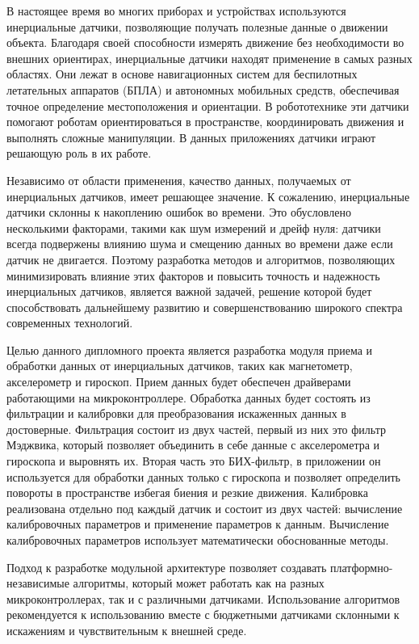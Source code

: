 \label{sec:intro}

В настоящее время во многих приборах и устройствах используются инерциальные датчики, 
позволяющие получать полезные данные о движении объекта.
Благодаря своей способности измерять движение без необходимости во внешних ориентирах, 
инерциальные датчики находят применение в самых разных областях. Они лежат в основе навигационных 
систем для беспилотных летательных аппаратов (БПЛА) и автономных мобильных средств, обеспечивая 
точное определение местоположения и ориентации. В робототехнике эти датчики помогают роботам 
ориентироваться в пространстве, координировать движения и выполнять сложные манипуляции.
В данных приложениях датчики играют решающую роль в их работе.

Независимо от области применения, качество данных, получаемых от инерциальных датчиков, имеет решающее значение.
К сожалению, инерциальные датчики склонны к накоплению ошибок во времени. Это обусловлено несколькими факторами, 
такими как шум измерений и дрейф нуля: датчики всегда подвержены влиянию шума и смещению данных во времени даже если датчик не двигается.
Поэтому разработка методов и алгоритмов, позволяющих минимизировать влияние этих факторов и повысить точность и надежность инерциальных датчиков,
является важной задачей, решение которой будет способствовать дальнейшему развитию и совершенствованию широкого спектра современных технологий.

Целью данного дипломного проекта является разработка модуля приема и обработки данных от инерциальных датчиков,
таких как магнетометр, акселерометр и гироскоп. Прием данных будет обеспечен драйверами работающими на микроконтроллере.
Обработка данных будет состоять из фильтрации и калибровки для преобразования искаженных данных в достоверные. 
Фильтрация состоит из двух частей, первый из них это фильтр Мэджвика, который позволяет объединить в себе данные с 
акселерометра и гироскопа и выровнять их. Вторая часть это БИХ-фильтр, в приложении он используется для обработки данных только с гироскопа
и позволяет определить повороты в пространстве избегая биения и резкие движения. 
Калибровка реализована отдельно под каждый датчик и состоит из двух частей: вычисление калибровочных параметров и применение параметров к данным.
Вычисление калибровочных параметров использует математически обоснованные методы. 

Подход к разработке модульной архитектуре позволяет создавать платформно-независимые алгоритмы, который может работать как на разных 
микроконтроллерах, так и с различными датчиками. Использование алгоритмов рекомендуется к использованию вместе с 
бюджетными датчиками склонными к искажениям и чувствительным к
внешней среде. 

